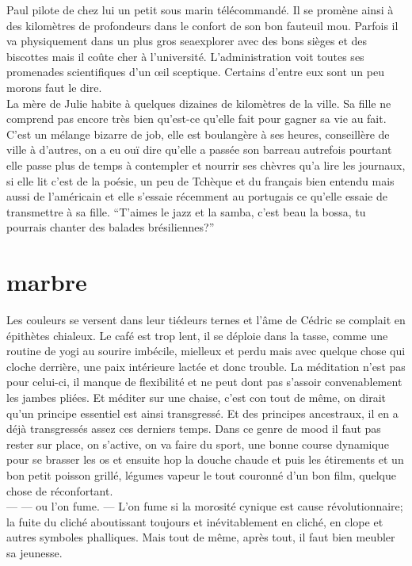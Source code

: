 \documentclass{article}
\begin{document}
Paul pilote de chez lui un petit sous marin télécommandé. Il se promène ainsi à
des kilomètres de profondeurs dans le confort de son bon fauteuil mou. Parfois
il va physiquement dans un plus gros seaexplorer avec des bons sièges et des
biscottes mais il coûte cher à l’université. L’administration voit toutes ses
promenades scientifiques d’un œil sceptique. Certains d’entre eux sont un peu
morons faut le dire.  \\
\clearpage
La mère de Julie habite à quelques dizaines de kilomètres de la ville. Sa fille
ne comprend pas encore très bien qu’est-ce qu’elle fait pour gagner sa vie au
fait. C’est un mélange bizarre de job, elle est boulangère à ses heures,
conseillère de ville à d’autres, on a eu ouï dire qu’elle a passée son barreau
autrefois pourtant elle passe plus de temps à contempler et nourrir ses chèvres
qu’a lire les journaux, si elle lit c’est de la poésie, un peu de Tchèque et du
français bien entendu mais aussi de l’américain et elle s’essaie récemment au
portugais ce qu’elle essaie de transmettre à sa fille. “T’aimes le jazz et la
samba, c’est beau la bossa, tu pourrais chanter des balades brésiliennes?”
\clearpage

\section{marbre}

Les couleurs se versent dans leur tiédeurs ternes et l'âme de Cédric se complait
en épithètes chialeux. Le café est trop lent, il se déploie dans la tasse, comme
une routine de yogi au sourire imbécile, mielleux et perdu mais avec quelque
chose qui cloche derrière, une paix intérieure lactée et donc trouble. La
méditation n'est pas pour celui-ci, il manque de flexibilité et ne peut dont pas
s'assoir convenablement les jambes pliées. Et méditer sur une chaise, c'est con
tout de même, on dirait qu'un principe essentiel est ainsi transgressé. Et des
principes ancestraux, il en a déjà transgressés assez ces derniers temps. Dans
ce genre de mood il faut pas rester sur place, on s'active, on va faire du
sport, une bonne course dynamique pour se brasser les os et ensuite hop la
douche chaude et puis les étirements et un bon petit poisson grillé, légumes
vapeur le tout couronné d'un bon film, quelque chose de réconfortant. \\--- ---
ou l'on fume. --- L'on fume si la morosité cynique est cause révolutionnaire; la
fuite du cliché aboutissant toujours et inévitablement en cliché, en clope et
autres symboles phalliques. Mais tout de même, après tout, il faut bien meubler
sa jeunesse. \\
\end{document}
